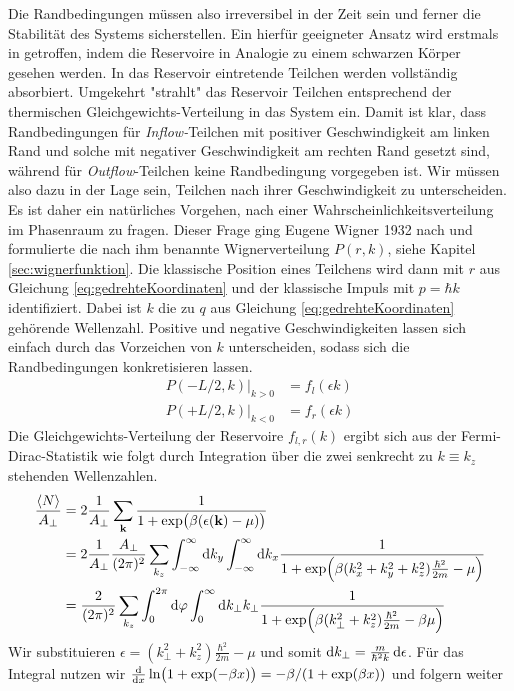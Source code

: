 Die Randbedingungen müssen also irreversibel in der Zeit sein und ferner die Stabilität des Systems sicherstellen. Ein hierfür geeigneter Ansatz wird erstmals in \cite{frensley2} getroffen, indem die Reservoire in Analogie zu einem schwarzen Körper gesehen werden. In das Reservoir eintretende Teilchen werden vollständig absorbiert. Umgekehrt "strahlt" das Reservoir Teilchen entsprechend der thermischen Gleichgewichts-Verteilung in das System ein. Damit ist klar, dass Randbedingungen für \emph{Inflow-}Teilchen mit positiver Geschwindigkeit am linken Rand und solche mit negativer Geschwindigkeit am rechten Rand gesetzt sind, während für \emph{Outflow}-Teilchen keine Randbedingung vorgegeben ist. Wir müssen also dazu in der Lage sein, Teilchen nach ihrer Geschwindigkeit zu unterscheiden.
Es ist daher ein natürliches Vorgehen, nach einer Wahrscheinlichkeitsverteilung im Phasenraum zu fragen. Dieser Frage ging Eugene Wigner 1932 nach \cite{wigner} und formulierte die nach ihm benannte Wignerverteilung $P(r, k)$, siehe Kapitel \ref{sec:wignerfunktion}. Die klassische Position eines Teilchens wird dann mit $r$ aus Gleichung \eqref{eq:gedrehteKoordinaten} und der klassische Impuls mit $p=\hbar k$ identifiziert.
Dabei ist $k$ die zu $q$ aus Gleichung \eqref{eq:gedrehteKoordinaten} gehörende Wellenzahl. Positive und negative Geschwindigkeiten lassen sich einfach durch das Vorzeichen von $k$ unterscheiden, sodass sich die Randbedingungen konkretisieren lassen.
\begin{align}
  P(-L/2,k)|_{k>0} &= f_l(\epsilon{k}) \\
  P(+L/2,k)|_{k<0} &= f_r(\epsilon{k})
\end{align}
Die Gleichgewichts-Verteilung der Reservoire $f_{l,r}(k)$ ergibt sich aus der Fermi-Dirac-Statistik wie folgt durch Integration über die zwei senkrecht zu $k\equiv k_z$ stehenden Wellenzahlen.
\begin{align}
  \frac{\expval{N}}{A_{\perp}} &= 2\frac{1}{A_{\perp}}\sum_{\vb{k}}\frac{1}{1+\exp(\beta(\epsilon(\vb{k}) - \mu))} \\
    &= 2\frac{1}{A_{\perp}}  \frac{A_{\perp}}{(2\pi)^2} \sum_{k_z}\int_{-\infty}^{\infty} \mathop{}\!\mathrm{d} k_y \int_{-\infty}^{\infty} \mathop{}\!\mathrm{d} k_x \frac{1}{1+\exp(\beta(k_x^2 + k_y^2 + k_z^2)\frac{\hbar^2}{2m} - \mu)} \\
    &= \frac{2}{(2\pi)^2} \sum_{k_z} \int_0^{2\pi} \mathop{}\!\mathrm{d} \varphi \int_0^{\infty} \mathop{}\!\mathrm{d} k_{\perp} k_{\perp} \frac{1}{1+\exp(\beta(k_{\perp}^2 + k_z^2)\frac{\hbar^2}{2m} - \beta \mu)}
\end{align}
Wir substituieren $\epsilon = (k^2_{\perp} + k_z^2)\frac{\hbar^2}{2m} - \mu$ und somit $\mathop{}\!\mathrm{d} k_\perp = \frac{m}{\hbar^2 k}\mathop{}\!\mathrm{d} \epsilon$. Für das Integral nutzen wir $\frac{\mathrm{d}}{\mathrm{d}x}\ln(1+\exp(-\beta x)) = -\beta / (1+\exp(\beta x))$ und folgern weiter
